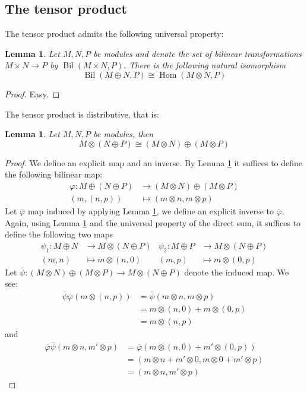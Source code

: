 \documentclass[12pt]{article}
\theoremstyle{plain}
\newtheorem{lemma}[thm]{Lemma}
\theoremstyle{definition}
\newcommand{\lto}{\longrightarrow}
\begin{document}
\subsection{The tensor product}
The tensor product admits the following universal property:
\begin{lemma}\label{lem:tens_univ_prop}
Let $M,N,P$ be modules and denote the set of bilinear transformations $M \times N \lto P$ by $\operatorname{Bil}(M \times N, P)$. There is the following natural isomorphism
\begin{equation}
\operatorname{Bil}(M \oplus N, P) \cong \operatorname{Hom}(M \otimes N, P)
\end{equation}
\end{lemma}
\begin{proof}
Easy.
\end{proof}
The tensor product is distributive, that is:
\begin{lemma}\label{lem:distributivity}
Let $M,N,P$ be modules, then
\begin{equation}
M \otimes (N \oplus P) \cong (M \otimes N) \oplus (M \otimes P)
\end{equation}
\end{lemma}
\begin{proof}
We define an explicit map and an inverse. By Lemma \ref{lem:tens_univ_prop} it suffices to define the following bilinear map:
\begin{align*}
\varphi: M \oplus (N \oplus P) &\lto (M \otimes N) \oplus (M \otimes P)\\
(m,(n,p)) &\longmapsto (m \otimes n, m \otimes p)
\end{align*}
Let $\overline{\varphi}$ map induced by applying Lemma \ref{lem:tens_univ_prop}, we define an explicit inverse to $\overline{\varphi}$. Again, using Lemma \ref{lem:tens_univ_prop} and the universal property of the direct sum, it suffices to define the following two maps
\begin{align*}
\psi_1: M \oplus N &\lto M \otimes (N \oplus P) & \psi_2: M \oplus P &\lto M \otimes (N \oplus P)\\
(m,n) &\longmapsto m \otimes (n,0) & (m,p) &\longmapsto m \otimes (0,p)
\end{align*}
Let $\overline{\psi}: (M \otimes N) \oplus (M \otimes P) \lto M \otimes (N \oplus P)$ denote the induced map. We see:
\begin{align*}
\overline{\psi}\overline{\varphi}(m \otimes (n,p)) &= \overline{\psi}(m \otimes n, m \otimes p)\\
&= m \otimes (n,0) + m \otimes (0,p)\\
&= m \otimes (n,p)
\end{align*}
and
\begin{align*}
\overline{\varphi}\overline{\psi}(m \otimes n, m' \otimes p) &= \overline{\varphi}(m \otimes (n,0) + m' \otimes (0,p))\\
&= (m \otimes n + m' \otimes 0,  m \otimes 0+ m' \otimes p)\\
&= (m \otimes n, m' \otimes p)
\end{align*}
\end{proof}
\end{document}
